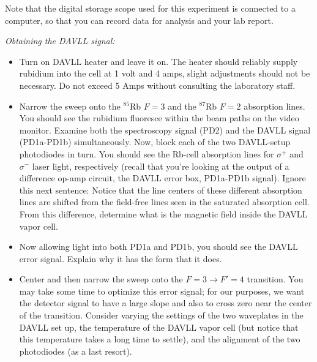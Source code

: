 \documentclass{../lab}
\begin{document}

Note that the digital storage scope used for this experiment is connected to a computer, so that you can record data for analysis and your lab report.

\emph{Obtaining the DAVLL signal:}

\begin{itemize}
    \item Turn on DAVLL heater and leave it on. The heater should reliably supply rubidium into the cell at 1 volt and 4 amps, slight adjustments should not be necessary. Do not exceed 5 Amps without consulting the laboratory staff.

    \item Narrow the sweep onto the $^{85}$Rb $F=3 $ and the $^{87}$Rb $F=2 $ absorption lines. You should see the rubidium fluoresce within the beam paths on the video monitor. Examine both the spectroscopy signal (PD2) and the DAVLL signal (PD1a-PD1b) simultaneously. Now, block each of the two DAVLL-setup photodiodes in turn. You should see the Rb-cell absorption lines for $\sigma^+ $ and $\sigma^-$ laser light, respectively (recall that you're looking at the output of a difference op-amp circuit, the DAVLL error box, PD1a-PD1b signal). Ignore this next sentence: Notice that the line centers of these different absorption lines are shifted from the field-free lines seen in the saturated absorption cell. From this difference, determine what is the magnetic field inside the DAVLL vapor cell.

    \item Now allowing light into both PD1a and PD1b, you should see the DAVLL error signal. Explain why it has the form that it does.

    \item Center and then narrow the sweep onto the $F = 3 \rightarrow F' = 4 $ transition. You may take some time to optimize this error signal; for our purposes, we want the detector signal to have a large slope and also to cross zero near the center of the transition. Consider varying the settings of the two waveplates in the DAVLL set up, the temperature of the DAVLL vapor cell (but notice that this temperature takes a long time to settle), and the alignment of the two photodiodes (as a last resort).
\end{itemize}
\end{document}

